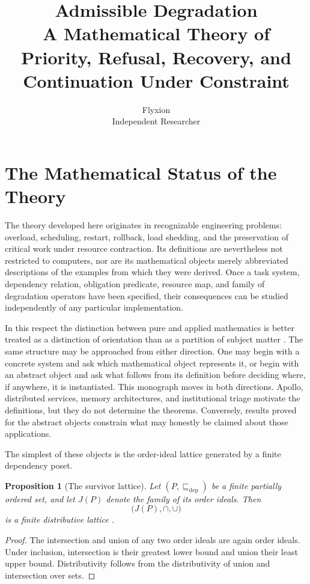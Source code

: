 \documentclass[11pt]{report}
\title{Admissible Degradation\\
\large A Mathematical Theory of Priority, Refusal, Recovery, and Continuation Under Constraint}
\author{Flyxion \\ \small Independent Researcher}
\date{}
\newtheorem*{frontproposition}{Proposition}
\begin{document}
\maketitle
\tableofcontents

\chapter*{The Mathematical Status of the Theory}

The theory developed here originates in recognizable engineering
problems: overload, scheduling, restart, rollback, load shedding, and the
preservation of critical work under resource contraction. Its definitions
are nevertheless not restricted to computers, nor are its mathematical
objects merely abbreviated descriptions of the examples from which they
were derived. Once a task system, dependency relation, obligation
predicate, resource map, and family of degradation operators have been
specified, their consequences can be studied independently of any
particular implementation.

In this respect the distinction between pure and applied mathematics is
better treated as a distinction of orientation than as a partition of
subject matter \cite{hardy1940}. The same structure may be approached from either
direction. One may begin with a concrete system and ask which
mathematical object represents it, or begin with an abstract object and
ask what follows from its definition before deciding where, if anywhere,
it is instantiated. This monograph moves in both directions. Apollo,
distributed services, memory architectures, and institutional triage
motivate the definitions, but they do not determine the theorems.
Conversely, results proved for the abstract objects constrain what may
honestly be claimed about those applications.

The simplest of these objects is the order-ideal lattice generated by a
finite dependency poset.

\begin{frontproposition}[The survivor lattice]
Let $(P,\sqsubseteq_{\mathrm{dep}})$ be a finite partially ordered set,
and let $J(P)$ denote the family of its order ideals. Then
\[
\bigl(J(P),\cap,\cup\bigr)
\]
is a finite distributive lattice \cite{birkhoff1967}.
\end{frontproposition}

\begin{proof}
The intersection and union of any two order ideals are again order
ideals. Under inclusion, intersection is their greatest lower bound and
union their least upper bound. Distributivity follows from the
distributivity of union and intersection over sets.
\end{proof}
\end{document}
